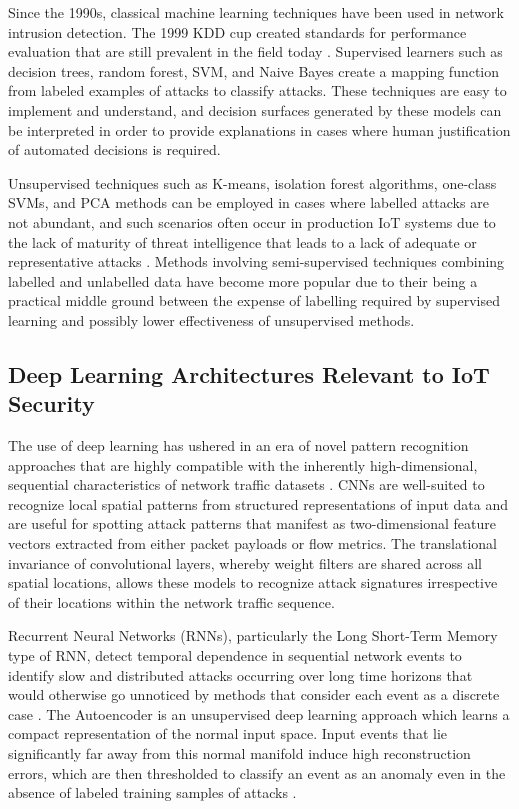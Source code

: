 \documentclass[12pt]{article}
\begin{document}
Since the 1990s, classical machine learning techniques have been used in network intrusion detection. The 1999 KDD cup created standards for performance evaluation that are still prevalent in the field today \cite{ferrag2020deep}. Supervised learners such as decision trees, random forest, SVM, and Naive Bayes create a mapping function from labeled examples of attacks to classify attacks. These techniques are easy to implement and understand, and decision surfaces generated by these models can be interpreted in order to provide explanations in cases where human justification of automated decisions is required.

Unsupervised techniques such as K-means, isolation forest algorithms, one-class SVMs, and PCA methods can be employed in cases where labelled attacks are not abundant, and such scenarios often occur in production IoT systems due to the lack of maturity of threat intelligence that leads to a lack of adequate or representative attacks \cite{pajouh2019two}. Methods involving semi-supervised techniques combining labelled and unlabelled data have become more popular due to their being a practical middle ground between the expense of labelling required by supervised learning and possibly lower effectiveness of unsupervised methods.

\subsection{Deep Learning Architectures Relevant to IoT Security}

The use of deep learning has ushered in an era of novel pattern recognition approaches that are highly compatible with the inherently high-dimensional, sequential characteristics of network traffic datasets \cite{shone2018deep}. CNNs are well-suited to recognize local spatial patterns from structured representations of input data and are useful for spotting attack patterns that manifest as two-dimensional feature vectors extracted from either packet payloads or flow metrics. The translational invariance of convolutional layers, whereby weight filters are shared across all spatial locations, allows these models to recognize attack signatures irrespective of their locations within the network traffic sequence.

Recurrent Neural Networks (RNNs), particularly the Long Short-Term Memory type of RNN, detect temporal dependence in sequential network events to identify slow and distributed attacks occurring over long time horizons that would otherwise go unnoticed by methods that consider each event as a discrete case \cite{yin2017deep}. The Autoencoder is an unsupervised deep learning approach which learns a compact representation of the normal input space. Input events that lie significantly far away from this normal manifold induce high reconstruction errors, which are then thresholded to classify an event as an anomaly even in the absence of labeled training samples of attacks \cite{meidan2018n}.
\end{document}
